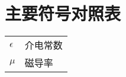 
\chapter{主要符号对照表}
\label{chap:symb}


\begin{center}
	

\vspace{1cm}
\begin{tabular}{ll}

$\epsilon$       & \hspace{5em}介电常数 \\
$\mu$ \qquad     & \hspace{5em}磁导率 \\


\end{tabular}


\end{center}
